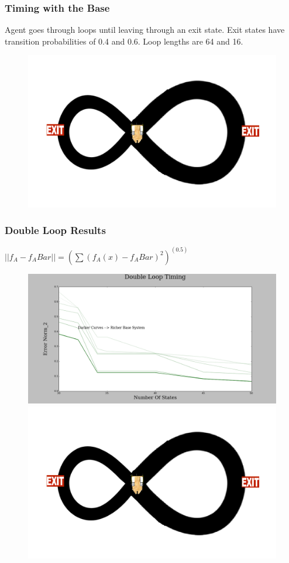 \documentclass{beamer}
\begin{document}
\begin{frame}
\frametitle{Timing with the Base}
Agent goes through loops until leaving through an exit state. Exit states have transition probabilities of 0.4 and 0.6. Loop lengths are 64 and 16.
\begin{figure}
\includegraphics[width=0.8\linewidth]{lucasplots/monImages/doubleLoopImage.png}
\end{figure}
\end{frame}



\begin{frame}
\frametitle{Double Loop Results}

$||f_A - f_ABar|| = (\sum (f_A(x) - f_ABar)^2)^(0.5)$ 

\begin{figure}
\includegraphics[width=0.5\linewidth]{lucasplots/monImages/DoubleLoopTiming0.png}
\includegraphics[width=0.5\linewidth]{lucasplots/monImages/doubleLoopImage.png}

\end{figure}
\end{frame}
\end{document}
